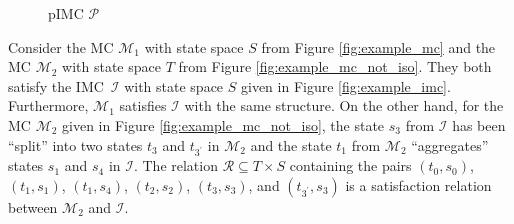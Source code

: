 \documentclass{llncs}
\newcommand{\mc}{\textnormal{MC}}
\newcommand{\imc}{\textnormal{IMC}}
\newcommand{\pimc}{\textnormal{pIMC}}
\begin{document}
\begin{figure*}[t]
{\begin{minipage}[t]{.46\textwidth}
\begin{center}
{}
\caption{{\pimc} $\mathcal{P}$}\label{fig:example_pimc}
\end{center}
\end{minipage}}
\vspace*{-0.4cm}
\end{figure*}

\begin{example}\label{ex:mcs_satify_imc}
Consider the {\mc} $\mathcal{M}_1$ with state space $S$ from Figure \ref{fig:example_mc} and 
the {\mc} $\mathcal{M}_2$ with state space $T$ from Figure \ref{fig:example_mc_not_iso}. They both 
satisfy the \imc\ $\mathcal{I}$ with state space $S$ given in Figure \ref{fig:example_imc}.
Furthermore, $\mathcal{M}_1$ satisfies $\mathcal{I}$ with the same structure.
On the other hand, for the {\mc} $\mathcal{M}_2$ given in Figure \ref{fig:example_mc_not_iso}, 
the state $s_3$ from $\mathcal{I}$ has been ``split'' into two states $t_3$ and $t_{3^\prime}$ in $\mathcal{M}_2$
and the state $t_1$ from $\mathcal{M}_2$ ``aggregates'' states $s_1$ and $s_4$ in $\mathcal{I}$.
The relation $\mathcal{R} \subseteq T \times S$ containing the pairs 
$(t_0,s_0)$, $(t_1,s_1)$, $(t_1,s_4)$, $(t_2,s_2)$, $(t_3,s_3)$, and $(t_{3^\prime}, s_3)$ 
is a satisfaction relation between $\mathcal{M}_2$ and $\mathcal{I}$.
\end{example}
\end{document}
